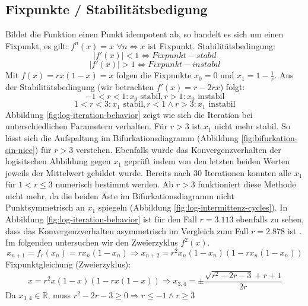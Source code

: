 \documentclass[12pt,a4paper]{article}
\begin{document}
\subsection{Fixpunkte / Stabilitätsbedigung}
Bildet die Funktion einen Punkt idempotent ab, so handelt es sich um einen Fixpunkt, es gilt: $f^n(x)=x$ $\forall n \iff x$ ist Fixpunkt. 
Stabilitätsbedingung:
\begin{equation} |f'(x)|<1 \iff Fixpunkt-stabil \end{equation}
\begin{equation} |f'(x)|>1 \iff Fixpunkt-instabil \end{equation}
Mit $ f(x)=rx(1-x)=x $ folgen die Fixpunkte $x_{0}=0$ und $x_{1}=1-\frac{1}{r}$. Aus der Stabilitätsbedingung (wir betrachten $f'(x)=r-2rx$) folgt:
\begin{equation}
-1 < r < 1: x_{0} \text{ stabil}, r > 1: x_{0} \text{ instabil}
\end{equation}
\begin{equation}
1 < r < 3: x_1 \text{ stabil}, r<1 \wedge  r> 3: x_1 \text{ instabil}
\end{equation}
Abbildung \ref{fig:log-iteration-behavior} zeigt wie sich die Iteration bei unterschiedlichen Parametern verhalten. Für $r>3$ ist $x_1$ nicht mehr stabil. So lässt sich die Aufspaltung im Bifurkationsdiagramm (Abbildung \ref{fig:bifurkation-sin-nice}) für $r>3$ verstehen. Ebenfalls wurde das Konvergenzverhalten der logisitschen Abbildung gegen $x_1$ geprüft indem von den letzten beiden Werten jeweils der Mittelwert gebildet wurde. Bereits nach 30 Iterationen konnten alle $x_1$ für $1 < r \leq 3$ numerisch bestimmt werden. Ab $r>3$ funktioniert diese Methode nicht mehr, da die beiden Äste im Bifurkationsdiagramm nicht Punktsymmetrisch an $x_1$ spiegeln (Abbildung \ref{fig:log-intermittenz-cycles}). In Abbildung \ref{fig:log-iteration-behavior} ist für den Fall $r=3.113$ ebenfalls zu sehen, dass das Konvergenzverhalten asymmetrisch im Vergleich zum Fall $r=2.878$ ist .
Im folgenden untersuchen wir den Zweierzyklus $f^2(x)$.
\begin{equation}x_{n+1}=f_r(x_n)=rx_n(1-x_n)
\Rightarrow x_{n+2}=r^2x_n(1-x_n)(1-rx_n(1-x_n))\end{equation}
\newline
Fixpunktgleichung (Zweierzyklus):
\begin{equation}
x=r^2x(1-x)(1-rx(1-x))
\Rightarrow 
x_{3,4}=\pm\frac{\sqrt{r^2-2 r-3}+r+1}{2 r}
\end{equation}
Da $x_{3,4} \in \mathbb{R} $, muss $r^2-2 r-3 \geq 0 \Rightarrow r \leq -1 \land r \geq 3$
\end{document}
